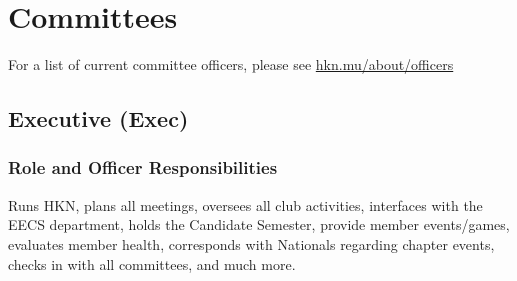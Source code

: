 \documentclass[11pt, article, oneside]{memoir}
\begin{document}

    \newpage
    \chapter{Committees}

    For a list of current committee officers, please see \href{https://hkn.mu/about/officers}{hkn.mu/about/officers}

    \section{Executive (Exec)}
    \subsection{Role and Officer Responsibilities}
        Runs HKN, plans all meetings, oversees all club activities, interfaces with the EECS department, holds the Candidate Semester, provide member events/games, evaluates member health, corresponds with Nationals regarding chapter events, checks in with all committees, and much more. 
\end{document}
